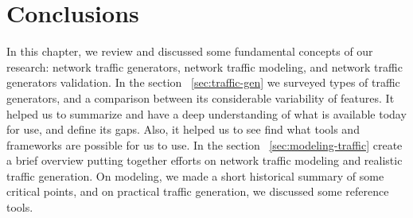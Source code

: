 \section{Conclusions}

In this chapter, we review and discussed some fundamental concepts of our research: network traffic generators, network traffic modeling, and network traffic generators validation. In the section ~\ref{sec:traffic-gen} we surveyed types of traffic generators, and a comparison between its considerable variability of features. It helped us to summarize and have a deep understanding of what is available today for use, and define its gaps. Also, it helped us to see find what tools and frameworks are possible for us to use. In the section ~\ref{sec:modeling-traffic} create a brief overview putting together efforts on network traffic modeling and realistic traffic generation. On modeling, we made a short historical summary of some critical points, and on practical traffic generation, we discussed some reference tools.








